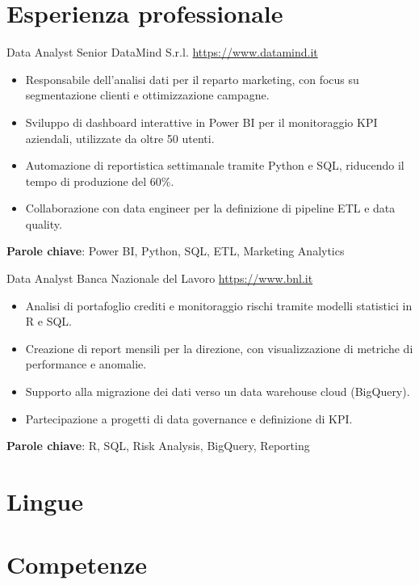 \documentclass[a4paper, serif, 10pt]{moderncv}
\begin{document}
\section{Esperienza professionale}

        {Data Analyst Senior}
        {DataMind S.r.l.}
        {\url{https://www.datamind.it}}
        {}
        {\begin{itemize}
\item Responsabile dell'analisi dati per il reparto marketing, con focus su segmentazione clienti e ottimizzazione campagne.
\item Sviluppo di dashboard interattive in Power BI per il monitoraggio KPI aziendali, utilizzate da oltre 50 utenti.
\item Automazione di reportistica settimanale tramite Python e SQL, riducendo il tempo di produzione del 60\%.
\item Collaborazione con data engineer per la definizione di pipeline ETL e data quality.
\end{itemize}
\textbf{Parole chiave}: Power BI, Python, SQL, ETL, Marketing Analytics}

        {Data Analyst}
        {Banca Nazionale del Lavoro}
        {\url{https://www.bnl.it}}
        {}
        {\begin{itemize}
\item Analisi di portafoglio crediti e monitoraggio rischi tramite modelli statistici in R e SQL.
\item Creazione di report mensili per la direzione, con visualizzazione di metriche di performance e anomalie.
\item Supporto alla migrazione dei dati verso un data warehouse cloud (BigQuery).
\item Partecipazione a progetti di data governance e definizione di KPI.
\end{itemize}
\textbf{Parole chiave}: R, SQL, Risk Analysis, BigQuery, Reporting}
\section{Lingue}

\section{Competenze}
\end{document}
